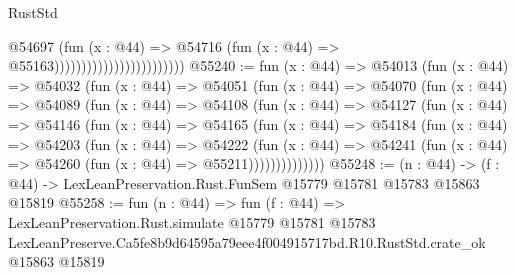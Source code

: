 \begin{lexlean}{RustStd}
\begin{coremodule}
                                              @54697
                                                (fun (x : @44) =>
                                                @54716
                                                  (fun (x : @44) => @55163))))))))))))))))))))))))
@55240 := fun (x : @44) =>
  @54013
    (fun (x : @44) =>
    @54032
      (fun (x : @44) =>
      @54051
        (fun (x : @44) =>
        @54070
          (fun (x : @44) =>
          @54089
            (fun (x : @44) =>
            @54108
              (fun (x : @44) =>
              @54127
                (fun (x : @44) =>
                @54146
                  (fun (x : @44) =>
                  @54165
                    (fun (x : @44) =>
                    @54184
                      (fun (x : @44) =>
                      @54203
                        (fun (x : @44) =>
                        @54222
                          (fun (x : @44) =>
                          @54241 (fun (x : @44) => @54260 (fun (x : @44) => @55211))))))))))))))
@55248 := (n : @44) ->
  (f : @44) -> LexLeanPreservation.Rust.FunSem @15779 @15781 @15783 @15863 @15819
@55258 := fun (n : @44) =>
  fun (f : @44) =>
  LexLeanPreservation.Rust.simulate
    @15779
    @15781
    @15783
    LexLeanPreserve.Ca5fe8b9d64595a79eee4f004915717bd.R10.RustStd.crate_ok
    @15863
    @15819
\end{coremodule}
\end{lexlean}
